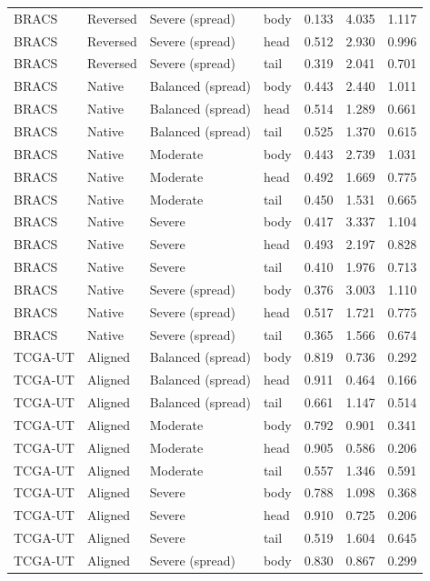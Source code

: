 \begin{longtable}{lllllll}
BRACS & Reversed & Severe (spread) & body & 0.133 & 4.035 & 1.117 \\
BRACS & Reversed & Severe (spread) & head & 0.512 & 2.930 & 0.996 \\
BRACS & Reversed & Severe (spread) & tail & 0.319 & 2.041 & 0.701 \\
BRACS & Native & Balanced (spread) & body & 0.443 & 2.440 & 1.011 \\
BRACS & Native & Balanced (spread) & head & 0.514 & 1.289 & 0.661 \\
BRACS & Native & Balanced (spread) & tail & 0.525 & 1.370 & 0.615 \\
BRACS & Native & Moderate & body & 0.443 & 2.739 & 1.031 \\
BRACS & Native & Moderate & head & 0.492 & 1.669 & 0.775 \\
BRACS & Native & Moderate & tail & 0.450 & 1.531 & 0.665 \\
BRACS & Native & Severe & body & 0.417 & 3.337 & 1.104 \\
BRACS & Native & Severe & head & 0.493 & 2.197 & 0.828 \\
BRACS & Native & Severe & tail & 0.410 & 1.976 & 0.713 \\
BRACS & Native & Severe (spread) & body & 0.376 & 3.003 & 1.110 \\
BRACS & Native & Severe (spread) & head & 0.517 & 1.721 & 0.775 \\
BRACS & Native & Severe (spread) & tail & 0.365 & 1.566 & 0.674 \\
TCGA-UT & Aligned & Balanced (spread) & body & 0.819 & 0.736 & 0.292 \\
TCGA-UT & Aligned & Balanced (spread) & head & 0.911 & 0.464 & 0.166 \\
TCGA-UT & Aligned & Balanced (spread) & tail & 0.661 & 1.147 & 0.514 \\
TCGA-UT & Aligned & Moderate & body & 0.792 & 0.901 & 0.341 \\
TCGA-UT & Aligned & Moderate & head & 0.905 & 0.586 & 0.206 \\
TCGA-UT & Aligned & Moderate & tail & 0.557 & 1.346 & 0.591 \\
TCGA-UT & Aligned & Severe & body & 0.788 & 1.098 & 0.368 \\
TCGA-UT & Aligned & Severe & head & 0.910 & 0.725 & 0.206 \\
TCGA-UT & Aligned & Severe & tail & 0.519 & 1.604 & 0.645 \\
TCGA-UT & Aligned & Severe (spread) & body & 0.830 & 0.867 & 0.299 \\

\end{longtable}
